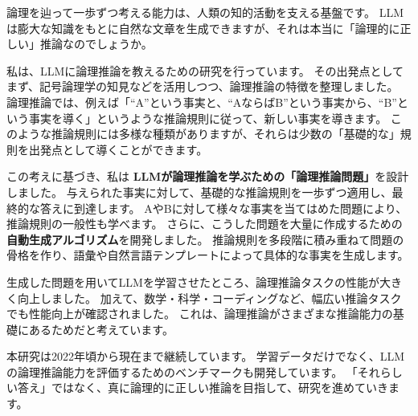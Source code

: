 論理を辿って一歩ずつ考える能力は、人類の知的活動を支える基盤です。
LLMは膨大な知識をもとに自然な文章を生成できますが、それは本当に「論理的に正しい」推論なのでしょうか。

私は、LLMに論理推論を教えるための研究を行っています。
その出発点としてまず、記号論理学の知見などを活用しつつ、論理推論の特徴を整理しました。
論理推論では、例えば「``A''という事実と、``AならばB''という事実から、``B''という事実を導く」というような推論規則に従って、新しい事実を導きます。
このような推論規則には多様な種類がありますが、それらは少数の「基礎的な」規則を出発点として導くことができます。

この考えに基づき、私は \textbf{LLMが論理推論を学ぶための「論理推論問題」}を設計しました。
与えられた事実に対して、基礎的な推論規則を一歩ずつ適用し、最終的な答えに到達します。
AやBに対して様々な事実を当てはめた問題により、推論規則の一般性も学べます。
さらに、こうした問題を大量に作成するための \textbf{自動生成アルゴリズム}を開発しました。
推論規則を多段階に積み重ねて問題の骨格を作り、語彙や自然言語テンプレートによって具体的な事実を生成します。

生成した問題を用いてLLMを学習させたところ、論理推論タスクの性能が大きく向上しました。
加えて、数学・科学・コーディングなど、幅広い推論タスクでも性能向上が確認されました。
これは、論理推論がさまざまな推論能力の基礎にあるためだと考えています。

本研究は2022年頃から現在まで継続しています。
学習データだけでなく、LLMの論理推論能力を評価するためのベンチマークも開発しています。
「それらしい答え」ではなく、真に論理的に正しい推論を目指して、研究を進めていきます。
